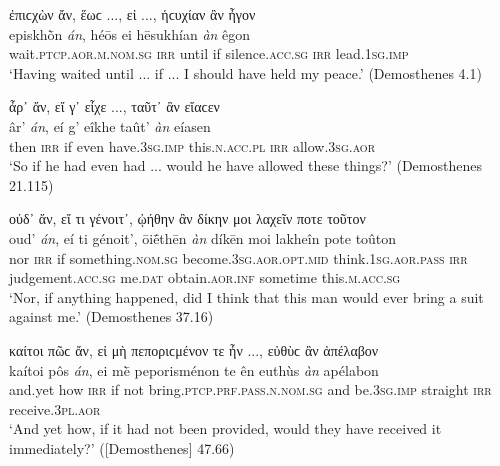 \begin{exe}
\ex ἐπιϲχὼν ἄν, ἕωϲ ..., εἰ ..., ἡϲυχίαν ἂν ἦγον\\
\gll episkhṑn \emph{án}, héōs ei hēsukhían \emph{àn} êgon\\
wait.\textsc{ptcp.aor.m.nom.sg} \textsc{irr} until if silence.\textsc{acc.sg} \textsc{irr} lead.\textsc{1sg.imp}\\
\trans `Having waited until ... if ... I should have held my peace.' (Demosthenes 4.1)
\label{anrepeat10}
\end{exe}

\begin{exe}
\ex ἆρ᾽ ἄν, εἴ γ᾽ εἶχε ..., ταῦτ᾽ ἂν εἴαϲεν\\
\gll âr' \emph{án}, eí g' eîkhe taût' \emph{àn} eíasen\\
then \textsc{irr} if even have.\textsc{3sg.imp} this.\textsc{n.acc.pl} \textsc{irr} allow.\textsc{3sg.aor}\\
\trans `So if he had even had ... would he have allowed these things?' (Demosthenes 21.115)
\label{anrepeat11}
\end{exe}

\begin{exe}
\ex οὐδ᾽ ἄν, εἴ τι γένοιτ᾽, ᾠήθην ἂν δίκην μοι λαχεῖν ποτε τοῦτον\\
\gll oud' \emph{án}, eí ti génoit', ōiḗthēn \emph{àn} díkēn moi lakheîn pote toûton\\
nor \textsc{irr} if something.\textsc{nom.sg} become.\textsc{3sg.aor.opt.mid} think.\textsc{1sg.aor.pass} \textsc{irr} judgement.\textsc{acc.sg} me.\textsc{dat} obtain.\textsc{aor.inf} sometime this.\textsc{m.acc.sg}\\
\trans `Nor, if anything happened, did I think that this man would ever bring a suit against me.' (Demosthenes 37.16)
\label{anrepeat12}
\end{exe}

\begin{exe}
\ex καίτοι πῶϲ ἄν, εἰ μὴ πεποριϲμένον τε ἦν ..., εὐθὺϲ ἂν ἀπέλαβον\\
\gll kaítoi pôs \emph{án}, ei mḕ peporisménon te ên euthùs \emph{àn} apélabon\\
and.yet how \textsc{irr} if not bring.\textsc{ptcp.prf.pass.n.nom.sg} and be.\textsc{3sg.imp} straight \textsc{irr} receive.\textsc{3pl.aor}\\
\trans `And yet how, if it had not been provided, would they have received it immediately?' ({[}Demosthenes{]} 47.66)
\label{anrepeat13}
\end{exe}

